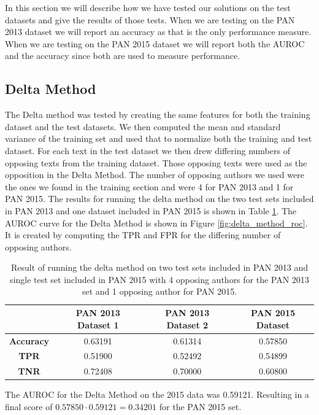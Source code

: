 In this section we will describe how we have tested our solutions on the test
datasets and give the results of those tests. When we are testing on the PAN
2013 dataset we will report an accuracy as that is the only performance measure.
When we are testing on the PAN 2015 dataset we will report both the \gls{AUROC}
and the accuracy since both are used to measure performance.

\subsection{Delta Method} \label{subsec:results:delta_method}
The Delta method was tested by creating the same features for both the training
dataset and the test datasets. We then computed the mean and standard variance
of the training set and used that to normalize both the training and test
dataset. For each text in the test dataset we then drew differing numbers of
opposing texts from the training dataset. Those opposing texts were used as
the opposition in the Delta Method. The number of opposing authors we used
were the ones we found in the training section and were 4 for PAN 2013 and 1
for PAN 2015. The results for running the delta method on the two test sets
included in PAN 2013 and one dataset included in PAN 2015 is shown in Table
\ref{tab:delta_method_final_results}. The \gls{AUROC} curve for the Delta Method
is shown in Figure \ref{fig:delta_method_roc}. It is created by computing the
\gls{TPR} and \gls{FPR} for the differing number of opposing authors.

\begin{table}
    \centering
    \begin{tabular}{c|ccc}
        & \textbf{PAN 2013 Dataset 1} & \textbf{PAN 2013 Dataset 2} & \textbf{PAN 2015 Dataset}\\
        \hline
        \textbf{Accuracy}  & 0.63191 & 0.61314 & 0.57850 \\
        \textbf{\gls{TPR}} & 0.51900 & 0.52492 & 0.54899 \\
        \textbf{\gls{TNR}} & 0.72408 & 0.70000 & 0.60800
    \end{tabular}
    \caption{Result of running the delta method on two test sets included in PAN
    2013 and single test set included in PAN 2015 with 4 opposing authors for
    the PAN 2013 set and 1 opposing author for PAN 2015.}
    \label{tab:delta_method_final_results}
\end{table}


The \gls{AUROC} for the Delta Method on the 2015 data was 0.59121. Resulting
in a final score of $0.57850 \cdot 0.59121 = 0.34201$ for the PAN 2015 set.


